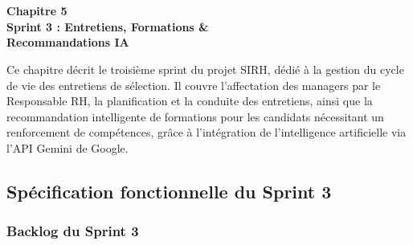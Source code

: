 
\chapter*{}
\thispagestyle{empty}

\begin{center}
  \vspace*{2cm}
  {\Huge\bfseries\color{blue!70} Chapitre 5}\\[0.8cm]
  {\LARGE\bfseries\color{blue!70} Sprint 3 : Entretiens, Formations \&}\\[0.3cm]
  {\LARGE\bfseries\color{blue!70} Recommandations IA}\\[1.5cm]

  \begin{tcolorbox}[
    enhanced,
    colback=blue!5,
    colframe=blue!70,
    boxrule=1.5pt,
    arc=4pt,
    width=0.85\textwidth,
    halign=center
  ]
    \large
    Ce chapitre décrit le troisième sprint du projet SIRH, dédié à la gestion
    du cycle de vie des entretiens de sélection. Il couvre l'affectation des
    managers par le Responsable RH, la planification et la conduite des entretiens,
    ainsi que la recommandation intelligente de formations pour les candidats
    nécessitant un renforcement de compétences, grâce à l'intégration de
    l'intelligence artificielle via l'API Gemini de Google.
  \end{tcolorbox}
\end{center}

\newpage

\renewcommand{\thesection}{\Roman{section}.}
\renewcommand{\thesubsection}{\Roman{section}.\arabic{subsection}.}

\section{Spécification fonctionnelle du Sprint 3}

\subsection{Backlog du Sprint 3}

